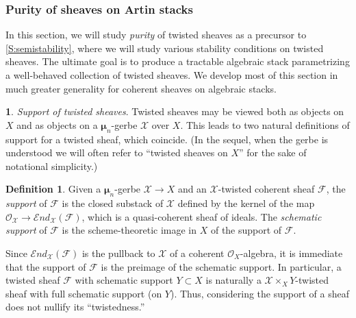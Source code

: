 \documentclass[11pt]{amsart}
\newcommand{\ms}[1]{\mathscr #1}
\newcommand{\send}{\ms E\!nd}
\newcommand{\m}{\boldsymbol{\mu}}
\renewcommand{\[}{[\!\hspace{0.03em}[}
\renewcommand{\]}{]\!\hspace{0.03em}]}
\renewcommand{\(}{(\!\hspace{0.03em}(}
\renewcommand{\)}{)\!\hspace{0.03em})}
\theoremstyle{definition}
\newtheorem{defn}[lem]{Definition}
\newtheorem{para}[lem]{\indent}
\theoremstyle{remark}
\begin{document}
\subsubsection{Purity of sheaves on Artin stacks}\label{S:purity}
In this section, we will study \emph{purity\/} of 
twisted sheaves as a precursor to \ref{S:semistability}, where we 
will study various stability conditions on twisted sheaves.  The ultimate goal is to produce a tractable algebraic stack parametrizing a well-behaved collection of twisted sheaves.  We develop most of this section in much greater generality for coherent sheaves on algebraic stacks.

\begin{para} \emph{Support of twisted sheaves\/}.  Twisted sheaves 
may be viewed both as objects on $X$ and as 
objects on a $\m_{n}$-gerbe $\ms X$ over $X$.  This 
leads to two natural definitions of support for a twisted sheaf, 
which coincide.  (In the sequel, when the gerbe 
is understood we will often 
refer to ``twisted sheaves on $X$'' for the sake of notational 
simplicity.)
\end{para}

\begin{defn} Given a $\m_{n}$-gerbe $\ms X\to X$ and an $\ms 
X$-twisted coherent sheaf $\ms F$, the \emph{support\/} of $\ms F$ is the 
closed substack of $\ms X$ defined by the kernel of the map $\ms 
O_{\ms X}\to \send_{\ms X}(\ms F)$, which is a quasi-coherent sheaf of 
ideals.  The \emph{schematic support\/} 
of $\ms F$ is the scheme-theoretic image in $X$ of the support of $\ms 
F$.
\end{defn}
Since $\send_{\ms X}(\ms F)$ is the pullback to $\ms X$ of a coherent 
${\ms O}_{X}$-algebra, it is immediate that the support of $\ms F$ is the 
preimage of the schematic support. 
In particular, a twisted sheaf $\ms F$ with 
schematic support $Y\subset X$ is naturally a $\ms 
X\times_{X}Y$-twisted sheaf with full schematic support (on $Y$).  
Thus, considering the support of a sheaf does not nullify its ``twistedness.''
\end{document}
